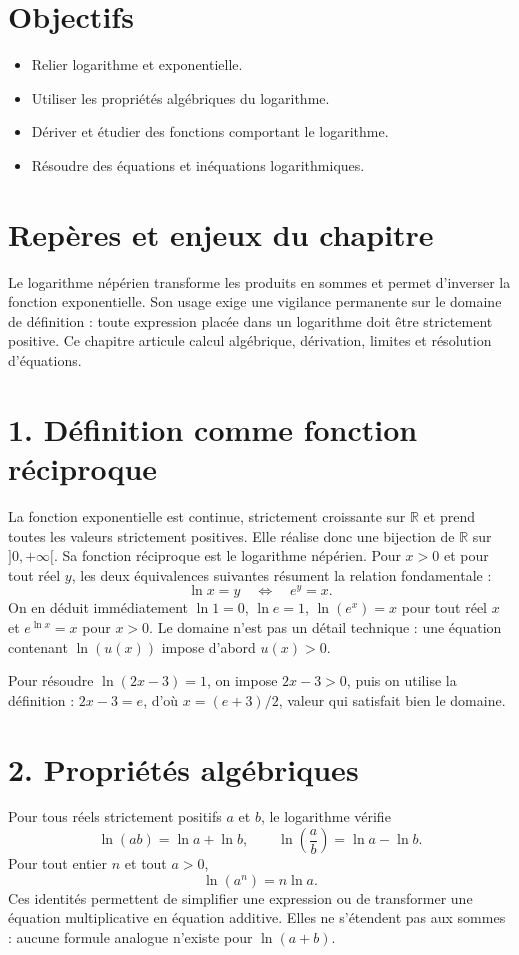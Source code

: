 
\section{Objectifs}
\begin{itemize}
\item Relier logarithme et exponentielle.
\item Utiliser les propriétés algébriques du logarithme.
\item Dériver et étudier des fonctions comportant le logarithme.
\item Résoudre des équations et inéquations logarithmiques.
\end{itemize}

\section{Repères et enjeux du chapitre}
Le logarithme népérien transforme les produits en sommes et permet d’inverser la fonction exponentielle. Son usage exige une vigilance permanente sur le domaine de définition : toute expression placée dans un logarithme doit être strictement positive. Ce chapitre articule calcul algébrique, dérivation, limites et résolution d’équations.

\section{1. Définition comme fonction réciproque}
La fonction exponentielle est continue, strictement croissante sur $\mathbb{R}$ et prend toutes les valeurs strictement positives. Elle réalise donc une bijection de $\mathbb{R}$ sur $]0,+\infty[$. Sa fonction réciproque est le logarithme népérien. Pour $x>0$ et pour tout réel $y$, les deux équivalences suivantes résument la relation fondamentale :
\[
\ln x=y\quad\Longleftrightarrow\quad e^y=x.
\]
On en déduit immédiatement $\ln 1=0$, $\ln e=1$, $\ln(e^x)=x$ pour tout réel $x$ et $e^{\ln x}=x$ pour $x>0$. Le domaine n’est pas un détail technique : une équation contenant $\ln(u(x))$ impose d’abord $u(x)>0$.

\begin{exemple}
Pour résoudre $\ln(2x-3)=1$, on impose $2x-3>0$, puis on utilise la définition : $2x-3=e$, d’où $x=(e+3)/2$, valeur qui satisfait bien le domaine.
\end{exemple}

\section{2. Propriétés algébriques}
Pour tous réels strictement positifs $a$ et $b$, le logarithme vérifie
\[
\ln(ab)=\ln a+\ln b,\qquad \ln\!\left(\frac{a}{b}\right)=\ln a-\ln b.
\]
Pour tout entier $n$ et tout $a>0$,
\[
\ln(a^n)=n\ln a.
\]
Ces identités permettent de simplifier une expression ou de transformer une équation multiplicative en équation additive. Elles ne s’étendent pas aux sommes : aucune formule analogue n’existe pour $\ln(a+b)$.

